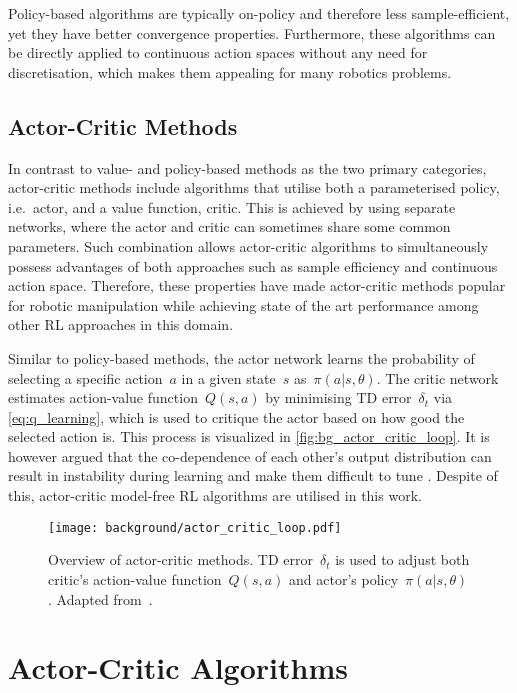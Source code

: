 Policy-based algorithms are typically on-policy and therefore less sample-efficient, yet they have better convergence properties. Furthermore, these algorithms can be directly applied to continuous action spaces without any need for discretisation, which makes them appealing for many robotics problems.


\subsection{Actor-Critic Methods}

In contrast to value- and policy-based methods as the two primary categories, actor-critic methods include algorithms that utilise both a parameterised policy, i.e.~actor, and a value function, critic. This is achieved by using separate networks, where the actor and critic can sometimes share some common parameters. Such combination allows actor-critic algorithms to simultaneously possess advantages of both approaches such as sample efficiency and continuous action space. Therefore, these properties have made actor-critic methods popular for robotic manipulation while achieving state of the art performance among other RL approaches in this domain.

Similar to policy-based methods, the actor network learns the probability of selecting a specific action~\(a\) in a given state~\(s\) as~\(\pi(a \vert s, \theta)\). The critic network estimates action-value function~\(Q(s, a)\) by minimising TD error~\(\delta_{t}\) via \autoref{eq:q_learning}, which is used to critique the actor based on how good the selected action is. This process is visualized in \autoref{fig:bg_actor_critic_loop}. It is however argued that the co-dependence of each other's output distribution can result in instability during learning and make them difficult to tune \cite{quillen_deep_2018}. Despite of this, actor-critic model-free RL algorithms are utilised in this work.

\begin{figure}[ht]
    \centering
    \texttt{[image: background/actor\_critic\_loop.pdf]}
    \caption{Overview of actor-critic methods. TD error~\(\delta_{t}\) is used to adjust both critic's action-value function~\(Q(s, a)\) and actor's policy~\(\pi(a \vert s, \theta)\). Adapted from~\protect\citet{sutton_reinforcement_2018}.}
    \label{fig:bg_actor_critic_loop}
\end{figure}


\section{Actor-Critic Algorithms}

